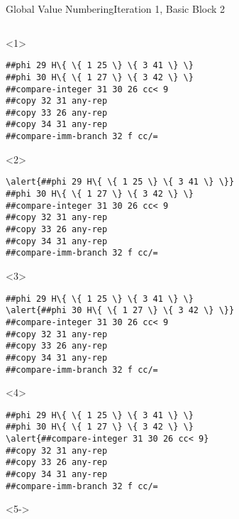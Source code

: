 \documentclass{beamer}
\begin{document}
\begin{frame}[fragile]{Global Value Numbering}{Iteration 1, Basic Block 2}
  \footnotesize
  \begin{columns}[t,onlytextwidth]
    \begin{column}[t]{.5\textwidth}
      \begin{onlyenv}<1>
        \begin{Verbatim}[frame=single,commandchars=\\\{\}]
##phi 29 H\{ \{ 1 25 \} \{ 3 41 \} \}
##phi 30 H\{ \{ 1 27 \} \{ 3 42 \} \}
##compare-integer 31 30 26 cc< 9
##copy 32 31 any-rep
##copy 33 26 any-rep
##copy 34 31 any-rep
##compare-imm-branch 32 f cc/=
        \end{Verbatim}
      \end{onlyenv}
      \begin{onlyenv}<2>
        \begin{Verbatim}[frame=single,commandchars=\\\{\}]
\alert{##phi 29 H\{ \{ 1 25 \} \{ 3 41 \} \}}
##phi 30 H\{ \{ 1 27 \} \{ 3 42 \} \}
##compare-integer 31 30 26 cc< 9
##copy 32 31 any-rep
##copy 33 26 any-rep
##copy 34 31 any-rep
##compare-imm-branch 32 f cc/=
        \end{Verbatim}
      \end{onlyenv}
      \begin{onlyenv}<3>
        \begin{Verbatim}[frame=single,commandchars=\\\{\}]
##phi 29 H\{ \{ 1 25 \} \{ 3 41 \} \}
\alert{##phi 30 H\{ \{ 1 27 \} \{ 3 42 \} \}}
##compare-integer 31 30 26 cc< 9
##copy 32 31 any-rep
##copy 33 26 any-rep
##copy 34 31 any-rep
##compare-imm-branch 32 f cc/=
        \end{Verbatim}
      \end{onlyenv}
      \begin{onlyenv}<4>
        \begin{Verbatim}[frame=single,commandchars=\\\{\}]
##phi 29 H\{ \{ 1 25 \} \{ 3 41 \} \}
##phi 30 H\{ \{ 1 27 \} \{ 3 42 \} \}
\alert{##compare-integer 31 30 26 cc< 9}
##copy 32 31 any-rep
##copy 33 26 any-rep
##copy 34 31 any-rep
##compare-imm-branch 32 f cc/=
        \end{Verbatim}
      \end{onlyenv}
      \begin{onlyenv}<5->
        \begin{Verbatim}[frame=single,commandchars=\\\{\}]

\end{Verbatim}
\end{onlyenv}
\end{column}
\end{columns}
\end{frame}
\end{document}
